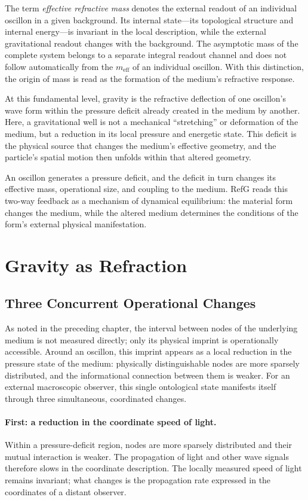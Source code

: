\documentclass[11pt,a4paper]{article}
\begin{document}
The term \emph{effective refractive mass} denotes the external readout of an individual oscillon in a given background. Its internal state---its topological structure and internal energy---is invariant in the local description, while the external gravitational readout changes with the background. The asymptotic mass of the complete system belongs to a separate integral readout channel and does not follow automatically from the $m_{\mathrm{eff}}$ of an individual oscillon. With this distinction, the origin of mass is read as the formation of the medium's refractive response.

At this fundamental level, gravity is the refractive deflection of one oscillon's wave form within the pressure deficit already created in the medium by another. Here, a gravitational well is not a mechanical ``stretching'' or deformation of the medium, but a reduction in its local pressure and energetic state. This deficit is the physical source that changes the medium's effective geometry, and the particle's spatial motion then unfolds within that altered geometry.

An oscillon generates a pressure deficit, and the deficit in turn changes its effective mass, operational size, and coupling to the medium. RefG reads this two-way feedback as a mechanism of dynamical equilibrium: the material form changes the medium, while the altered medium determines the conditions of the form's external physical manifestation.

\section{Gravity as Refraction}

\subsection{Three Concurrent Operational Changes}

As noted in the preceding chapter, the interval between nodes of the underlying medium is not measured directly; only its physical imprint is operationally accessible. Around an oscillon, this imprint appears as a local reduction in the pressure state of the medium: physically distinguishable nodes are more sparsely distributed, and the informational connection between them is weaker. For an external macroscopic observer, this single ontological state manifests itself through three simultaneous, coordinated changes.

\paragraph{First: a reduction in the coordinate speed of light.}
Within a pressure-deficit region, nodes are more sparsely distributed and their mutual interaction is weaker. The propagation of light and other wave signals therefore slows in the coordinate description. The locally measured speed of light remains invariant; what changes is the propagation rate expressed in the coordinates of a distant observer.
\end{document}
